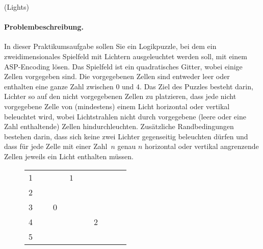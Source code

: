 \documentclass[a4paper,12pt,ngerman]{article}
\begin{document}
\begin{PraktikumsAufgabe}{1}{(Lights)}
\vspace*{-4mm}
\paragraph{Problembeschreibung.}
%
%
In dieser Praktikumsaufgabe sollen Sie ein Logikpuzzle,
bei dem ein zweidimensionales Spielfeld mit Lichtern ausgeleuchtet werden soll,
mit einem ASP-Encoding l\"osen.
Das Spielfeld ist ein quadratisches Gitter, 
wobei einige Zellen vorgegeben sind.
Die vorgegebenen Zellen sind entweder leer oder enthalten 
eine ganze Zahl zwischen $0$ und $4$.
Das Ziel des Puzzles besteht darin,
Lichter so auf den nicht vorgegebenen Zellen zu platzieren,
dass jede nicht vorgegebene Zelle von (mindestens) einem Licht
horizontal oder vertikal beleuchtet wird,
wobei
Lichtstrahlen nicht durch vorgegebene (leere
oder eine Zahl enthaltende) Zellen hindurchleuchten.
Zus\"atzliche Randbedingungen bestehen darin,
dass sich keine zwei Lichter gegenseitig beleuchten d\"urfen
und dass f\"ur jede Zelle mit einer Zahl~$n$ genau $n$ horizontal
oder vertikal angrenzende Zellen jeweils ein Licht enthalten m\"ussen.
%
\begin{figure}[h]
\begin{center}
\begin{tabular}{c@{~}|@{}p{5mm}@{}|@{}p{5mm}@{}|@{}p{5mm}@{}|@{}p{5mm}@{}|@{}p{5mm}@{}|@{}p{5mm}@{}|@{}p{5mm}@{}|l}
\cline{2-7}
\textsf{1} & & \hspace*{5.1mm}{\color{Tan}\rule[-1.6mm]{5mm}{5mm}} & ~$1$ & \hspace*{0.0mm}{\color{Tan}\rule[-1.6mm]{5mm}{5mm}} & & 
\\\cline{2-7}
\textsf{2} & & & & & &
\\\cline{2-7}
\textsf{3} & \hspace*{5.1mm}{\color{Tan}\rule[-1.6mm]{5mm}{5mm}} & ~$0 $ & & & \hspace*{0.0mm}{\color{Tan}\rule[-1.6mm]{5mm}{5mm}} & 
\\\cline{2-7}
\textsf{4} & & \hspace*{0.0mm}{\color{Tan}\rule[-1.6mm]{5mm}{5mm}} & \hspace*{10.1mm}{\color{Tan}\rule[-1.6mm]{5mm}{5mm}} & & ~$2$ & 
\\\cline{2-7}
\textsf{5} & & & & & &
\\\cline{2-7}

\end{tabular}
\end{center}
\end{figure}
\end{PraktikumsAufgabe}
\end{document}
